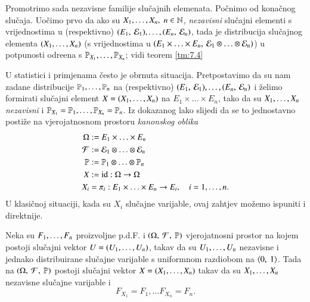 Promotrimo sada nezavisne familije slu\v cajnih elemenata.
Po\v cnimo od kona\v cnog slu\v caja.
Uo\v cimo prvo da ako su ${X}_1, \ldots, {X}_n, \; n \in \mathbb{N}$, \emph{nezavisni} slu\v cajni elementi s vrijednostima u (respektivno) $({E_1}, \: {\mathcal{E}_1}), \ldots, ({E_n}, \: {\mathcal{E}_n})$, tada je distribucija slu\v cajnog elementa $({X}_1, \ldots, {X}_n)$ (s vrijednostima u $({E_1 \times \ldots \times E_n}, \: {\mathcal{E}_1 \otimes \ldots \otimes \mathcal{E}_n})$) u potpunosti odre\dj ena s $\mathbb{P}_{X_1}, \ldots, \mathbb{P}_{X_n}$; vidi teorem \ref{tm:7.4}

U statistici i primjenama \v cesto je obrnuta situacija.
Pretpostavimo da su nam zadane distribucije ${\mathbb{P}}_1, \ldots, {\mathbb{P}}_n$ na (respektivno) $({E_1}, \: {\mathcal{E}_1}), \ldots, ({E_n}, \: {\mathcal{E}_n})$ i \v zelimo formirati slu\v cajni element $X = ({X}_1, \ldots, {X}_n)$ na $E_1 \times \ldots \times E_n$, tako da su ${X}_1, \ldots, {X}_n$ \emph{nezavisni} i $\mathbb{P}_{X_1} = \mathbb{P}_1, \ldots, \mathbb{P}_{X_n} = \mathbb{P}_n$.
Iz dokazanog lako slijedi da se to jednostavno posti\v ze na vjerojatnosnom prostoru \emph{kanonskog oblika}
\begin{equation} \label{jed:7.17}
    \begin{aligned}
        \Omega &:= E_1 \times \ldots \times E_n\\
        \mathcal{F} &:= \mathcal{E}_1 \otimes \ldots \otimes \mathcal{E}_n\\
        \mathbb{P} &:= \mathbb{P}_1 \otimes \ldots \otimes \mathbb{P}_n\\
        X &:= \mathrm{id} : \Omega \to \Omega\\
        X_i &= \pi_i : E_1 \times \ldots \times E_n \to E_i, \quad i = 1, \ldots, n.
    \end{aligned}
\end{equation}
U klasi\v cnoj situaciji, kada su $X_i$ slu\v cajne varijable, ovaj zahtjev mo\v zemo ispuniti i direktnije.

\begin{prop}    \label{prop:7.18}
    Neka su ${F}_1, \ldots, {F}_n$ proizvoljne p.d.F. i $(\Omega, \: \mathcal{F}, \: \mathbb{P})$ vjerojatnosni prostor na kojem postoji slu\v cajni vektor $U = ({U}_1, \ldots, {U}_n)$, takav da su ${U}_1, \ldots, {U}_n $ nezavisne i jednako distribuirane slu\v cajne varijable s uniformnom razdiobom na $\langle {0}, \: {1} \rangle$.
    Tada na $(\Omega, \: \mathcal{F}, \: \mathbb{P})$ postoji slu\v cajni vektor $X = ({X}_1, \ldots, {X}_n)$ takav da su ${X}_1, \ldots, {X}_n$ nezavisne slu\v cajne varijable i
    \begin{equation*}
        F_{X_1} = F_1, \ldots F_{X_n} = F_n.
    \end{equation*}
\end{prop}

